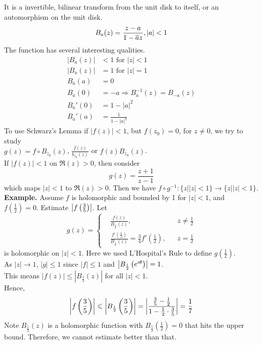 \documentclass[11pt]{article}
\DeclarePairedDelimiter\abs{\lvert}{\rvert}
\begin{document}
It is a invertible, bilinear transform from the unit disk to itself, or an automorphism on the unit disk. 
$$B_a(z) = \frac{z - a}{1 - \overline{a}z}, |a| < 1$$
The function has several interesting qualities. 
\begin{align*}
|B_a(z)| &< 1 \mbox{ for } |z| < 1 \\
|B_a(z)| &= 1 \mbox{ for } |z| = 1 \\
B_a(a) &= 0\\
B_a(0) &= -a \Rightarrow B_a^{-1}(z) = B_{-a}(z) \\
B_a'(0) &= 1 - |a|^2 \\
B_a'(a) &= \frac{1}{1 - |a|^2}
\end{align*}
To use Schwarz's Lemma if $|f(z)| < 1$, but $f(z_0) = 0$, for $z \neq 0$, we try to study \\
$g(z) = f \circ B_{z_0}(z)$, $\frac{f(z)}{b_{z_0}(z)}$ or $f(z)B_{z_0}(z)$.\\
If $|f(z)| < 1$ on $\Re(z) > 0$, then consider 
$$g(z) = \frac{z + 1}{z - 1}$$
which maps $|z| < 1$ to $\Re(z) > 0$. Then we have $f \circ g^{-1}: \{z| |z| < 1\} \to \{z| |z| < 1\}$.\\
\newline
\textbf{Example.} Assume $f$ is holomorphic and bounded by 1 for $|z| < 1$, and $f\left(\frac{1}{2}\right) = 0$. Estimate $\abs[\big]{f\left(\frac{3}{5}\right)}$.
Let 
\begin{equation*}
g(z) = \left \{
  \begin{aligned}
    &\frac{f(z)}{B_{\frac{1}{2}}(z)}, && z \neq \frac{1}{2} \\
    &\frac{f'\left(\frac{1}{2}\right)}{B_{\frac{1}{2}}(z)} = \frac{3}{4}f'\left(\frac{1}{2}\right), && z = \frac{1}{2} 
  \end{aligned} \right.
\end{equation*} 
is holomorphic on $|z| < 1$. Here we used L'Hospital's Rule to define $g\left(\frac{1}{2}\right)$. \\
As $|z| \to 1$, $|g| \leqslant 1$ since $|f| \leqslant 1 $ and $\abs[\big]{B_{\frac{1}{2}}\left(e^{i\theta}\right)} = 1$. \\
This means $|f(z)| \leqslant |B_{\frac{1}{2}}(z)|$ for all $|z| < 1$. \\
Hence, 
$$\abs*{f\left(\frac{3}{5}\right)} \leqslant \abs*{B_{\frac{1}{2}}\left(\frac{3}{5}\right)} = \abs*{\frac{\frac{3}{5} - \frac{1}{2}}{1 - \frac{1}{2}\cdot \frac{3}{5}}} = \frac{1}{7}$$
Note $B_{\frac{1}{2}}(z)$ is a holomorphic function with $B_{\frac{1}{2}}\left(\frac{1}{2}\right) = 0$ that hits the upper bound. Therefore, we cannot estimate better than that. \\
\end{document}
